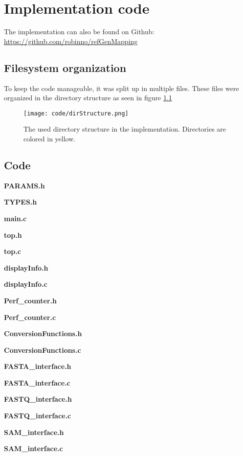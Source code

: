 \chapter{Implementation code}

The implementation can also be found on Github: \href{https://github.com/robinno/refGenMapping}{https://github.com/robinno/refGenMapping}

\section{Filesystem organization}

To keep the code manageable, it was split up in multiple files. These files were organized in the directory structure as seen in figure \ref{fig:dirStruct}

\begin{figure}[H]
	\centering
	\texttt{[image: code/dirStructure.png]}
	\caption{The used directory structure in the implementation. Directories are colored in yellow.}
	\label{fig:dirStruct}
\end{figure}

\section{Code}

\textbf{PARAMS.h}

\textbf{TYPES.h}

\textbf{main.c}



\textbf{top.h}

\textbf{top.c}

\textbf{displayInfo.h}

\textbf{displayInfo.c}

\textbf{Perf\_counter.h}

\textbf{Perf\_counter.c}



\textbf{ConversionFunctions.h}

\textbf{ConversionFunctions.c}

\textbf{FASTA\_interface.h}

\textbf{FASTA\_interface.c}

\textbf{FASTQ\_interface.h}

\textbf{FASTQ\_interface.c}

\textbf{SAM\_interface.h}

\textbf{SAM\_interface.c}



